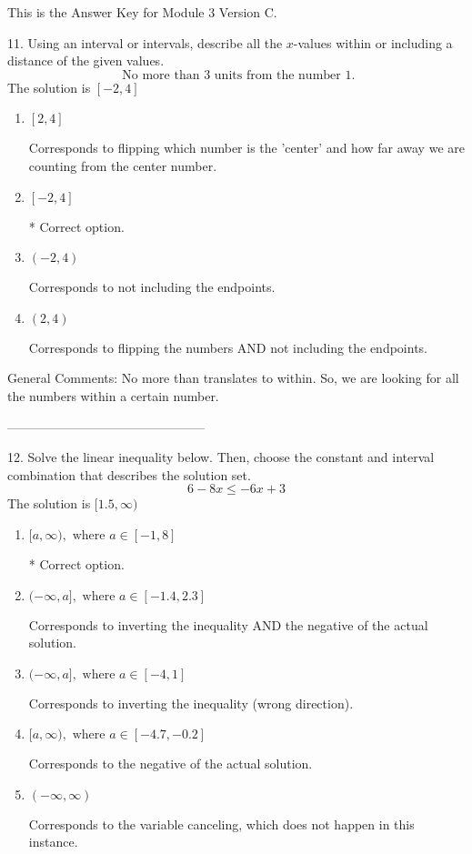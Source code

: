 \documentclass{article}[10pt]
\begin{document}
This is the Answer Key for Module 3 Version C.

11. Using an interval or intervals, describe all the $x$-values within or including a distance of the given values.
$$ \text{ No more than } 3 \text{ units from the number } 1. $$ 
The solution is $ [-2, 4] $ 

\begin{enumerate}[label=\Alph*.] 
\item $ [2, 4] $ 

 Corresponds to flipping which number is the 'center' and how far away we are counting from the center number. 
\item $ [-2, 4] $ 

 * Correct option. 
\item $ (-2, 4) $ 

 Corresponds to not including the endpoints. 
\item $ (2, 4) $ 

 Corresponds to flipping the numbers AND not including the endpoints. 
\end{enumerate} 
 
General Comments: No more than translates to within. So, we are looking for all the numbers within a certain number.

-----------------------------------------------

12. Solve the linear inequality below. Then, choose the constant and interval combination that describes the solution set.
$$ 6 - 8 x \leq -6 x + 3 $$ 
The solution is $ [1.5, \infty) $ 

\begin{enumerate}[label=\Alph*.] 
\item $ [a, \infty), \text{ where } a \in [-1, 8] $ 

  * Correct option. 
\item $ (-\infty, a], \text{ where } a \in [-1.4, 2.3] $ 

 Corresponds to inverting the inequality AND the negative of the actual solution. 
\item $ (-\infty, a], \text{ where } a \in [-4, 1] $ 

 Corresponds to inverting the inequality (wrong direction). 
\item $ [a, \infty), \text{ where } a \in [-4.7, -0.2] $ 

 Corresponds to the negative of the actual solution. 
\item $ (-\infty, \infty) $ 

 Corresponds to the variable canceling, which does not happen in this instance. 
\end{enumerate} 
 
\end{document}
